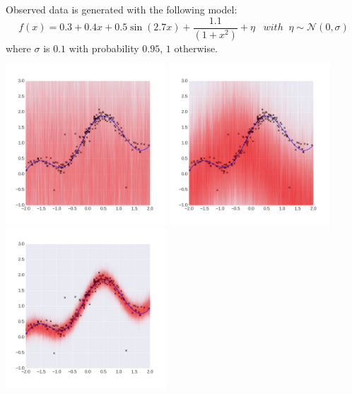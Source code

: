 \documentclass[a0,portrait]{a0poster}
\begin{document}
\begin{multicols}{2}
Observed data is generated with the following model: 
\begin{equation*}
f(x) =  0.3 + 0.4 x + 0.5 \sin(2.7x) + \frac{1.1}{(1+ x^2)} + \eta \;\;\; with\;\;\eta \sim \mathcal{N}(0,\sigma)
\end{equation*} where $\sigma$ is $0.1$ with probability $0.95$, $1$ otherwise.
\begin{center}
\includegraphics[width=6cm]{neal_se_1final.png}
\includegraphics[width=6cm]{neal_se_2final.png}
\includegraphics[width=6cm]{neal_se_3final.png}
\end{center}





\end{multicols}
\end{document}
